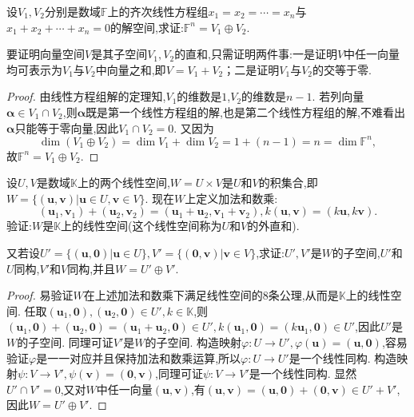 \documentclass[../../main.tex]{subfiles}%
\begin{document}
\begin{example}
设\(V_1,V_2\)分别是数域\(\mathbb{F}\)上的齐次线性方程组\(x_1 = x_2=\cdots = x_n\)与\(x_1 + x_2+\cdots + x_n = 0\)的解空间,求证:\(\mathbb{F}^n = V_1\oplus V_2\).
\end{example}
\begin{note}
要证明向量空间\(V\)是其子空间\(V_1,V_2\)的直和,只需证明两件事:一是证明\(V\)中任一向量均可表示为\(V_1\)与\(V_2\)中向量之和,即\(V = V_1 + V_2\)；二是证明\(V_1\)与\(V_2\)的交等于零.
\end{note}
\begin{proof}
由线性方程组解的定理知,\(V_1\)的维数是\(1\),\(V_2\)的维数是\(n - 1\). 若列向量\(\boldsymbol{\alpha}\in V_1\cap V_2\),则\(\boldsymbol{\alpha}\)既是第一个线性方程组的解,也是第二个线性方程组的解,不难看出\(\boldsymbol{\alpha}\)只能等于零向量,因此\(V_1\cap V_2 = 0\). 又因为
\[
\dim(V_1\oplus V_2)=\dim V_1+\dim V_2=1+(n - 1)=n=\dim\mathbb{F}^n,
\]
故\(\mathbb{F}^n = V_1\oplus V_2\).

\end{proof}

\begin{example}
设\(U,V\)是数域\(\mathbb{K}\)上的两个线性空间,\(W = U\times V\)是\(U\)和\(V\)的积集合,即\(W=\{(\boldsymbol{u},\boldsymbol{v})|\boldsymbol{u}\in U,\boldsymbol{v}\in V\}\). 现在\(W\)上定义加法和数乘:
\[
(\boldsymbol{u}_1,\boldsymbol{v}_1)+(\boldsymbol{u}_2,\boldsymbol{v}_2)=(\boldsymbol{u}_1+\boldsymbol{u}_2,\boldsymbol{v}_1+\boldsymbol{v}_2),k(\boldsymbol{u},\boldsymbol{v})=(k\boldsymbol{u},k\boldsymbol{v}).
\]
验证:\(W\)是\(\mathbb{K}\)上的线性空间(这个线性空间称为\(U\)和\(V\)的外直和).

又若设\(U'=\{(\boldsymbol{u},\boldsymbol{0})|\boldsymbol{u}\in U\},V'=\{(\boldsymbol{0},\boldsymbol{v})|\boldsymbol{v}\in V\}\),求证:\(U',V'\)是\(W\)的子空间,\(U'\)和\(U\)同构,\(V'\)和\(V\)同构,并且\(W = U'\oplus V'\).
\end{example}
\begin{proof}
易验证\(W\)在上述加法和数乘下满足线性空间的8条公理,从而是\(\mathbb{K}\)上的线性空间. 任取\((\boldsymbol{u}_1,\boldsymbol{0}),(\boldsymbol{u}_2,\boldsymbol{0})\in U',k\in\mathbb{K}\),则\((\boldsymbol{u}_1,\boldsymbol{0})+(\boldsymbol{u}_2,\boldsymbol{0})=(\boldsymbol{u}_1+\boldsymbol{u}_2,\boldsymbol{0})\in U',k(\boldsymbol{u}_1,\boldsymbol{0})=(k\boldsymbol{u}_1,\boldsymbol{0})\in U'\),因此\(U'\)是\(W\)的子空间. 同理可证\(V'\)是\(W\)的子空间. 构造映射\(\varphi:U\to U',\varphi(\boldsymbol{u})=(\boldsymbol{u},\boldsymbol{0})\),容易验证\(\varphi\)是一一对应并且保持加法和数乘运算,所以\(\varphi:U\to U'\)是一个线性同构. 构造映射\(\psi:V\to V',\psi(\boldsymbol{v})=(\boldsymbol{0},\boldsymbol{v})\),同理可证\(\psi:V\to V'\)是一个线性同构. 显然\(U'\cap V' = 0\),又对\(W\)中任一向量\((\boldsymbol{u},\boldsymbol{v})\),有\((\boldsymbol{u},\boldsymbol{v})=(\boldsymbol{u},\boldsymbol{0})+(\boldsymbol{0},\boldsymbol{v})\in U'+V'\),因此\(W = U'\oplus V'\). 

\end{proof}
\end{document}
